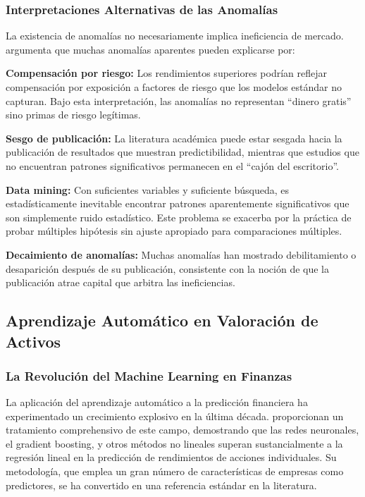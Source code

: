 \documentclass[11pt,a4paper]{article}
\begin{document}
\subsubsection{Interpretaciones Alternativas de las Anomalías}

La existencia de anomalías no necesariamente implica ineficiencia de mercado. \citet{malkiel2003} argumenta que muchas anomalías aparentes pueden explicarse por:

\textbf{Compensación por riesgo:} Los rendimientos superiores podrían reflejar compensación por exposición a factores de riesgo que los modelos estándar no capturan. Bajo esta interpretación, las anomalías no representan ``dinero gratis'' sino primas de riesgo legítimas.

\textbf{Sesgo de publicación:} La literatura académica puede estar sesgada hacia la publicación de resultados que muestran predictibilidad, mientras que estudios que no encuentran patrones significativos permanecen en el ``cajón del escritorio''.

\textbf{Data mining:} Con suficientes variables y suficiente búsqueda, es estadísticamente inevitable encontrar patrones aparentemente significativos que son simplemente ruido estadístico. Este problema se exacerba por la práctica de probar múltiples hipótesis sin ajuste apropiado para comparaciones múltiples.

\textbf{Decaimiento de anomalías:} Muchas anomalías han mostrado debilitamiento o desaparición después de su publicación, consistente con la noción de que la publicación atrae capital que arbitra las ineficiencias.

\subsection{Aprendizaje Automático en Valoración de Activos}

\subsubsection{La Revolución del Machine Learning en Finanzas}

La aplicación del aprendizaje automático a la predicción financiera ha experimentado un crecimiento explosivo en la última década. \citet{gu2020} proporcionan un tratamiento comprehensivo de este campo, demostrando que las redes neuronales, el gradient boosting, y otros métodos no lineales superan sustancialmente a la regresión lineal en la predicción de rendimientos de acciones individuales. Su metodología, que emplea un gran número de características de empresas como predictores, se ha convertido en una referencia estándar en la literatura.
\end{document}
